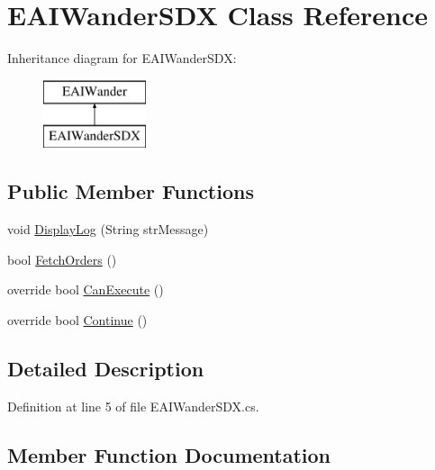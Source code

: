 \hypertarget{class_e_a_i_wander_s_d_x}{}\section{E\+A\+I\+Wander\+S\+DX Class Reference}
\label{class_e_a_i_wander_s_d_x}
Inheritance diagram for E\+A\+I\+Wander\+S\+DX\+:\begin{figure}[H]
\begin{center}
\leavevmode
\includegraphics[height=2.000000cm]{dd/dda/class_e_a_i_wander_s_d_x}
\end{center}
\end{figure}
\subsection*{Public Member Functions}
\begin{DoxyCompactItemize}
\item 
void \mbox{\hyperlink{class_e_a_i_wander_s_d_x_a91e335aef3d29f6e6b1d9317b7ba2b50}{Display\+Log}} (String str\+Message)
\item 
bool \mbox{\hyperlink{class_e_a_i_wander_s_d_x_a564d337c452713856e337d239de300ec}{Fetch\+Orders}} ()
\item 
override bool \mbox{\hyperlink{class_e_a_i_wander_s_d_x_ae4a69878b4e5b005fa95116187c0f4f2}{Can\+Execute}} ()
\item 
override bool \mbox{\hyperlink{class_e_a_i_wander_s_d_x_a72ffd17db1e7bde82569e03f8273af29}{Continue}} ()
\end{DoxyCompactItemize}


\subsection{Detailed Description}


Definition at line 5 of file E\+A\+I\+Wander\+S\+D\+X.\+cs.



\subsection{Member Function Documentation}
\mbox{\label{class_e_a_i_wander_s_d_x_ae4a69878b4e5b005fa95116187c0f4f2}} 
